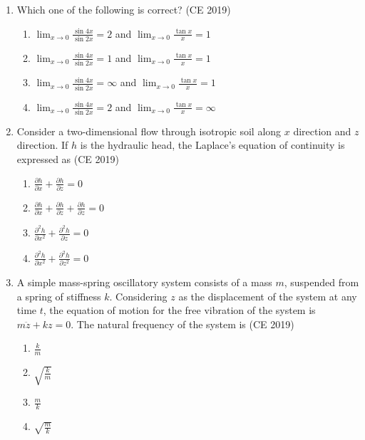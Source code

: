 \documentclass[journal]{IEEEtran}
\begin{document}
\begin{enumerate}
    
    \item Which one of the following is correct?  \hfill (CE 2019)
    \begin{multicols}{2}
        \begin{enumerate}
            \item $\lim_{x \to 0} \frac{\sin 4x}{\sin 2x} = 2$ and $\lim_{x \to 0} \frac{\tan x}{x} = 1$
            \item $\lim_{x \to 0} \frac{\sin 4x}{\sin 2x} = 1$ and $\lim_{x \to 0} \frac{\tan x}{x} = 1$
            \item $\lim_{x \to 0} \frac{\sin 4x}{\sin 2x} = \infty$ and $\lim_{x \to 0} \frac{\tan x}{x} = 1$
            \item $\lim_{x \to 0} \frac{\sin 4x}{\sin 2x} = 2$ and $\lim_{x \to 0} \frac{\tan x}{x} = \infty$
        \end{enumerate}
    \end{multicols}

    \item Consider a two-dimensional flow through isotropic soil along $x$ direction and $z$ direction. If $h$ is the hydraulic head, the Laplace's equation of continuity is expressed as  \hfill (CE 2019)
    \begin{multicols}{4}
        \begin{enumerate}
            \item $\frac{\partial h}{\partial x} + \frac{\partial h}{\partial z} = 0$
            \item $\frac{\partial h}{\partial x} + \frac{\partial h}{\partial z} + \frac{\partial h}{\partial z} = 0$
            \item $\frac{\partial^2 h}{\partial x^2} + \frac{\partial^2 h}{\partial z} = 0$
            \item $\frac{\partial^2 h}{\partial x^2} + \frac{\partial^2 h}{\partial z^2} = 0$
        \end{enumerate}
    \end{multicols}

    \item A simple mass-spring oscillatory system consists of a mass $m$, suspended from a spring of stiffness $k$. Considering $z$ as the displacement of the system at any time $t$, the equation of motion for the free vibration of the system is $m\ddot{z} + kz = 0$. The natural frequency of the system is  \hfill (CE 2019)
    \begin{multicols}{4}
        \begin{enumerate}
            \item $\frac{k}{m}$
            \item $\sqrt{\frac{k}{m}}$
            \item $\frac{m}{k}$
            \item $\sqrt{\frac{m}{k}}$
        \end{enumerate}
    \end{multicols}

\end{enumerate}
\end{document}
